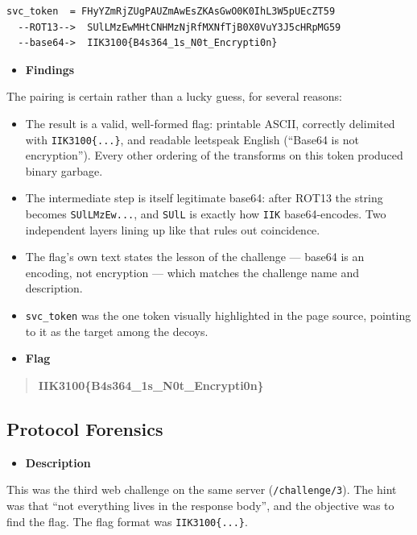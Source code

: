 \documentclass[11pt]{article}
\begin{document}
\begin{verbatim}
svc_token  = FHyYZmRjZUgPAUZmAwEsZKAsGwO0K0IhL3W5pUEcZT59
  --ROT13-->  SUlLMzEwMHtCNHMzNjRfMXNfTjB0X0VuY3J5cHRpMG59
  --base64->  IIK3100{B4s364_1s_N0t_Encrypti0n}
\end{verbatim}

\begin{itemize}[leftmargin=1.5em]
    \item \textbf{Findings}
\end{itemize}
\noindent The pairing is certain rather than a lucky guess, for several reasons:

\begin{itemize}[leftmargin=2.2em]
    \item The result is a valid, well-formed flag: printable ASCII, correctly delimited with \texttt{IIK3100\{...\}}, and readable leetspeak English (``Base64 is not encryption''). Every other ordering of the transforms on this token produced binary garbage.
    \item The intermediate step is itself legitimate base64: after ROT13 the string becomes \texttt{SUlLMzEw...}, and \texttt{SUlL} is exactly how \texttt{IIK} base64-encodes. Two independent layers lining up like that rules out coincidence.
    \item The flag's own text states the lesson of the challenge --- base64 is an encoding, not encryption --- which matches the challenge name and description.
    \item \texttt{svc\_token} was the one token visually highlighted in the page source, pointing to it as the target among the decoys.
\end{itemize}

\begin{itemize}[leftmargin=1.5em]
    \item \textbf{Flag}
\end{itemize}
\begin{quote}
\textbf{IIK3100\{B4s364\_1s\_N0t\_Encrypti0n\}}
\end{quote}

\subsection{Protocol Forensics}

\begin{itemize}[leftmargin=1.5em]
    \item \textbf{Description}
\end{itemize}
\noindent This was the third web challenge on the same server (\texttt{/challenge/3}). The hint was that ``not everything lives in the response body'', and the objective was to find the flag. The flag format was \texttt{IIK3100\{...\}}.
\end{document}
